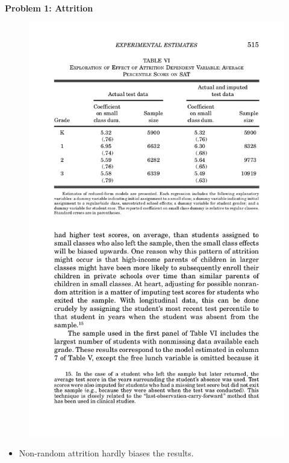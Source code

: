 \documentclass{beamer}
\begin{document}
\begin{frame}[plain, shrink=20]
	\begin{center}
	\textbf{Problem 1: Attrition}
	\end{center}
	
	\begin{figure}
	\includegraphics{./lecture_includes/krueger1999_table6.pdf}
	\end{figure}
	
	\begin{itemize}
	\item Non-random attrition hardly biases the results.
	\end{itemize}
\end{frame}
\end{document}
